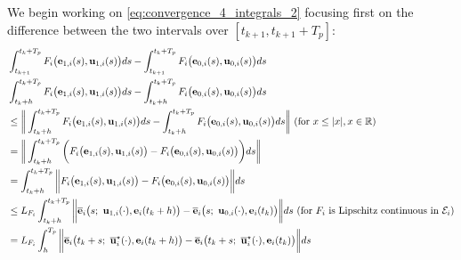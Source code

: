 We begin working on \eqref{eq:convergence_4_integrals_2} focusing
first on the difference between the two intervals over $[t_{k+1}, t_{k+1} + T_p]$:
\begin{align}
  &\int_{t_{k+1}}^{t_k + T_p} F_i \big(\vect{e}_{1,i}(s), \vect{u}_{1,i} (s)\big) d s
    - \int_{t_{k+1}}^{t_k + T_p} F_i \big(\vect{e}_{0,i}(s), \vect{u}_{0,i} (s)\big) d s \\
  &\int_{t_k+h}^{t_k + T_p} F_i \big(\vect{e}_{1,i}(s), \vect{u}_{1,i} (s)\big) d s
    - \int_{t_k+h}^{t_k + T_p} F_i \big(\vect{e}_{0,i}(s), \vect{u}_{0,i} (s)\big) d s \\
  & \leq \bigg\| \int_{t_k+h}^{t_k + T_p} F_i \big(\vect{e}_{1,i}(s), \vect{u}_{1,i} (s)\big) d s
    - \int_{t_k+h}^{t_k + T_p} F_i \big(\vect{e}_{0,i}(s), \vect{u}_{0,i} (s)\big) d s \bigg\|
    \text{ (for } x \leq |x|, x \in \mathbb{R} \text{)}\\
  & = \bigg\| \int_{t_k+h}^{t_k + T_p} \bigg( F_i \big(\vect{e}_{1,i}(s), \vect{u}_{1,i} (s)\big)
    -  F_i \big(\vect{e}_{0,i}(s), \vect{u}_{0,i} (s)\big) \bigg) d s \bigg\| \\
  & = \int_{t_k+h}^{t_k + T_p} \bigg\| F_i \big(\vect{e}_{1,i}(s), \vect{u}_{1,i} (s)\big)
    -  F_i \big(\vect{e}_{0,i}(s), \vect{u}_{0,i} (s)\big) \bigg\| d s \\
  & \leq L_{F_i}\int_{t_k+h}^{t_k + T_p} \bigg\| \overline{\vect{e}}_i\big(s;\ \vect{u}_{1,i} (\cdot), \vect{e}_i(t_k + h) \big)
    -  \overline{\vect{e}}_i\big(s;\ \vect{u}_{0,i} (\cdot), \vect{e}_i(t_k)\big) \bigg\| d s
    \text{ (for } F_i \text{ is Lipschitz continuous in } \mathcal{E}_i \text{)}  \\
    & = L_{F_i}\int_{h}^{T_p} \bigg\| \overline{\vect{e}}_i\big(t_k + s;\ \overline{\vect{u}}_i^{\star}(\cdot), \vect{e}_i(t_k + h) \big)
    -  \overline{\vect{e}}_i\big(t_k + s;\ \overline{\vect{u}}_i^{\star}(\cdot), \vect{e}_i(t_k)\big) \bigg\| d s
\label{eq:integrals_over_same_u_LV}
\end{align}


